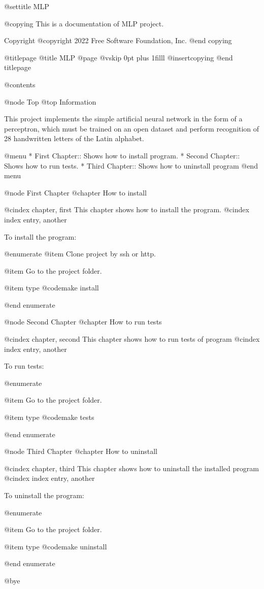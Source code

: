 
@settitle MLP

@copying
This is a documentation of MLP project.

Copyright @copyright{} 2022 Free Software Foundation, Inc.
@end copying

@titlepage
@title MLP
@page
@vskip 0pt plus 1filll
@insertcopying
@end titlepage

@contents

@node Top
@top Information

This project implements the simple artificial neural network in the form of a perceptron, which must be trained on an open dataset and perform recognition of 28 handwritten letters of the Latin alphabet.

@menu
* First Chapter::    Shows how to install program.
* Second Chapter::    Shows how to run tests.
* Third Chapter::   Shows how to uninstall program
@end menu

@node First Chapter
@chapter How to install

@cindex chapter, first
This chapter shows how to install the program.
@cindex index entry, another

To install the program:

@enumerate
@item
Clone project by ssh or http.

@item
Go to the project folder.

@item
type @code{make install}

@end enumerate

@node Second Chapter
@chapter How to run tests

@cindex chapter, second
This chapter shows how to run tests of  program
@cindex index entry, another

To run tests:

@enumerate

@item
Go to the project folder.

@item
type @code{make tests}

@end enumerate

@node Third Chapter
@chapter How to uninstall

@cindex chapter, third
This chapter shows how to uninstall the installed program
@cindex index entry, another

To uninstall the program:

@enumerate

@item
Go to the project folder.

@item
type @code{make uninstall}

@end enumerate

@bye

